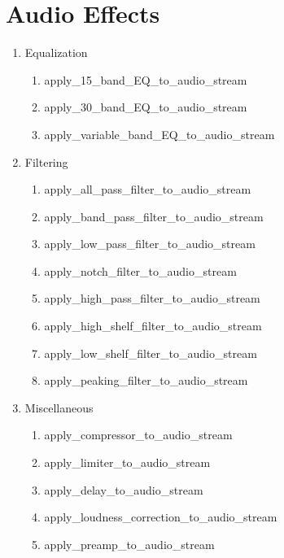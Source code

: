 \section{Audio Effects}

\begin{enumerate}

	\item Equalization
	\begin{enumerate}
		\item apply\_15\_band\_EQ\_to\_audio\_stream
		\item apply\_30\_band\_EQ\_to\_audio\_stream
		\item apply\_variable\_band\_EQ\_to\_audio\_stream
	\end{enumerate}

	\item Filtering
	\begin{enumerate}
		\item apply\_all\_pass\_filter\_to\_audio\_stream
		\item apply\_band\_pass\_filter\_to\_audio\_stream
		\item apply\_low\_pass\_filter\_to\_audio\_stream
		\item apply\_notch\_filter\_to\_audio\_stream
		\item apply\_high\_pass\_filter\_to\_audio\_stream
		\item apply\_high\_shelf\_filter\_to\_audio\_stream
		\item apply\_low\_shelf\_filter\_to\_audio\_stream
		\item apply\_peaking\_filter\_to\_audio\_stream
	\end{enumerate}

	\item Miscellaneous
	\begin{enumerate}
		\item apply\_compressor\_to\_audio\_stream
		\item apply\_limiter\_to\_audio\_stream
		\item apply\_delay\_to\_audio\_stream
		\item apply\_loudness\_correction\_to\_audio\_stream
		\item apply\_preamp\_to\_audio\_stream
	\end{enumerate}

\end{enumerate}
